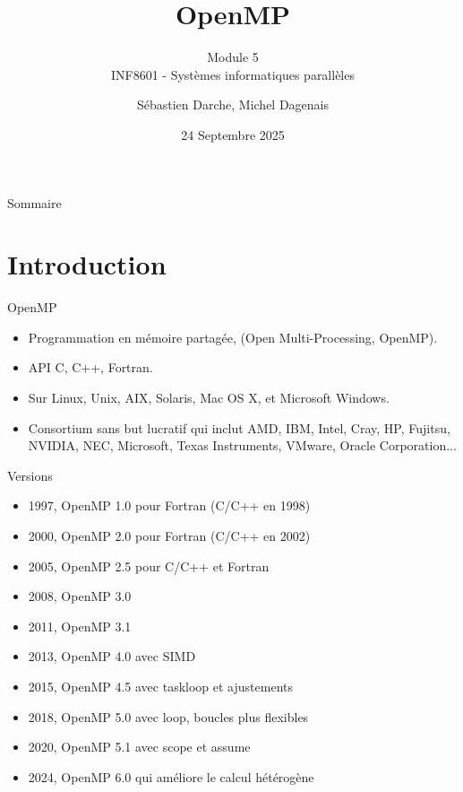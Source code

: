 \documentclass[10pt]{beamer}
\begin{document}
\title{OpenMP}
\subtitle{Module 5 \\
INF8601 - Systèmes informatiques parallèles}
\author{Sébastien Darche, Michel Dagenais}
\date{24 Septembre 2025} 

\begin{frame}[plain]
  \titlepage
\end{frame}

\begin{frame}{Sommaire}
  \tableofcontents
\end{frame}

\section{Introduction}

\begin{frame}{OpenMP}

  \begin{itemize}
    \item Programmation en mémoire partagée, (Open Multi-Processing, OpenMP).
    \item API C, C++, Fortran.
    \item Sur Linux, Unix, AIX, Solaris, Mac OS X, et Microsoft Windows.
    \item Consortium sans but lucratif qui inclut AMD, IBM, Intel, Cray, HP, Fujitsu, NVIDIA, NEC, Microsoft, Texas Instruments, VMware, Oracle Corporation...
  \end{itemize}
\end{frame}

\begin{frame}{Versions}

  \begin{itemize}
    \item 1997, OpenMP 1.0 pour Fortran (C/C++ en 1998)
    \item 2000, OpenMP 2.0 pour Fortran (C/C++ en 2002) 
    \item 2005, OpenMP 2.5 pour C/C++ et Fortran
    \item 2008, OpenMP 3.0
    \item 2011, OpenMP 3.1
    \item 2013, OpenMP 4.0 avec SIMD
    \item 2015, OpenMP 4.5 avec taskloop et ajustements
    \item 2018, OpenMP 5.0 avec loop, boucles plus flexibles
    \item 2020, OpenMP 5.1 avec scope et assume
    \item 2024, OpenMP 6.0 qui améliore le calcul hétérogène
  \end{itemize}
\end{frame}
\end{document}
